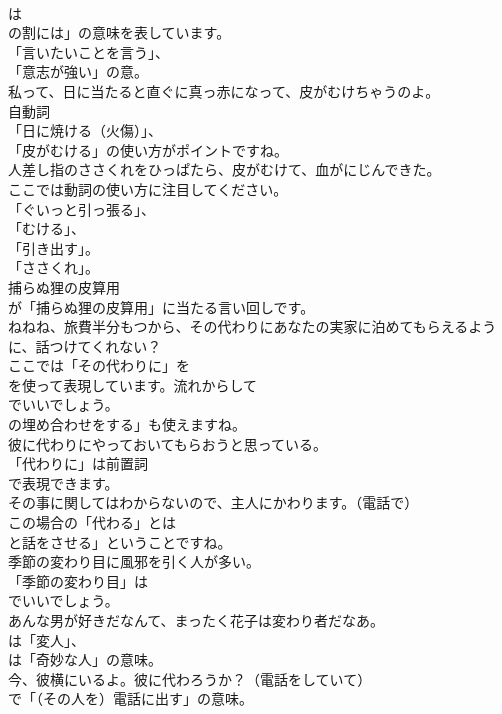 \documentclass[8pt]{extreport}
\begin{document}
\begin{CJK}{UTF8}{min}
\\	は
\\	の割には」の意味を表しています。
\\	「言いたいことを言う」、
\\	「意志が強い」の意。	
\\	私って、日に当たると直ぐに真っ赤になって、皮がむけちゃうのよ。 
\\	自動詞
\\	「日に焼ける（火傷）」、
\\	「皮がむける」の使い方がポイントですね。	
\\	人差し指のささくれをひっぱたら、皮がむけて、血がにじんできた。 
\\	ここでは動詞の使い方に注目してください。
\\	「ぐいっと引っ張る」、
\\	「むける」、
\\	「引き出す」。
\\	「ささくれ」。	
\\	捕らぬ狸の皮算用 
\\	が「捕らぬ狸の皮算用」に当たる言い回しです。	
\\	ねねね、旅費半分もつから、その代わりにあなたの実家に泊めてもらえるように、話つけてくれない？ 
\\	ここでは「その代わりに」を
\\	を使って表現しています。流れからして
\\	でいいでしょう。
\\	の埋め合わせをする」も使えますね。	
\\	彼に代わりにやっておいてもらおうと思っている。 
\\	「代わりに」は前置詞
\\	で表現できます。	
\\	その事に関してはわからないので、主人にかわります。（電話で） 
\\	この場合の「代わる」とは
\\	と話をさせる」ということですね。	
\\	季節の変わり目に風邪を引く人が多い。 
\\	「季節の変わり目」は
\\	でいいでしょう。	
\\	あんな男が好きだなんて、まったく花子は変わり者だなあ。 
\\	は「変人」、
\\	は「奇妙な人」の意味。	
\\	今、彼横にいるよ。彼に代わろうか？（電話をしていて） 
\\	で「（その人を）電話に出す」の意味。	

\end{CJK}
\end{document}
